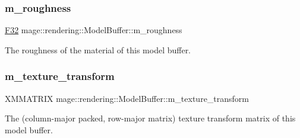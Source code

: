 \subsubsection{\texorpdfstring{m\+\_\+roughness}{m\_roughness}}
{\footnotesize\ttfamily \hyperlink{namespacemage_aa97e833b45f06d60a0a9c4fc22ae02c0}{F32} mage\+::rendering\+::\+Model\+Buffer\+::m\+\_\+roughness}

The roughness of the material of this model buffer. \hypertarget{structmage_1_1rendering_1_1_model_buffer_a89ae6a1222a84b0f166f5e46b35411b6}{}\label{structmage_1_1rendering_1_1_model_buffer_a89ae6a1222a84b0f166f5e46b35411b6} 
\subsubsection{\texorpdfstring{m\+\_\+texture\+\_\+transform}{m\_texture\_transform}}
{\footnotesize\ttfamily X\+M\+M\+A\+T\+R\+IX mage\+::rendering\+::\+Model\+Buffer\+::m\+\_\+texture\+\_\+transform}

The (column-\/major packed, row-\/major matrix) texture transform matrix of this model buffer. 